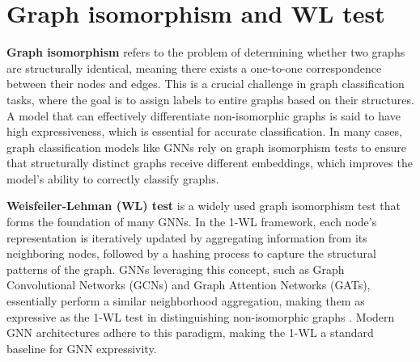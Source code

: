 \begin{table}[h]
    \centering
    \caption{Summary of pathway data across four pathway classes.}
    \label{tb:data_sum}
\end{table}

\section{Graph isomorphism and WL test}\label{Tools}
\textbf{Graph isomorphism} refers to the problem of determining whether two graphs are structurally identical, meaning there exists a one-to-one correspondence between their nodes and edges. This is a crucial challenge in graph classification tasks, where the goal is to assign labels to entire graphs based on their structures. A model that can effectively differentiate non-isomorphic graphs is said to have high expressiveness, which is essential for accurate classification. In many cases, graph classification models like GNNs rely on graph isomorphism tests to ensure that structurally distinct graphs receive different embeddings, which improves the model’s ability to correctly classify graphs. 

\noindent \textbf{Weisfeiler-Lehman (WL) test} is a widely used graph isomorphism test that forms the foundation of many GNNs. In the 1-WL framework, each node's representation is iteratively updated by aggregating information from its neighboring nodes, followed by a hashing process to capture the structural patterns of the graph. GNNs leveraging this concept, such as Graph Convolutional Networks (GCNs) and Graph Attention Networks (GATs), essentially perform a similar neighborhood aggregation, making them as expressive as the 1-WL test in distinguishing non-isomorphic graphs \citep{GIN}.  
Modern GNN architectures adhere to this paradigm, making the 1-WL a standard baseline for GNN expressivity.

